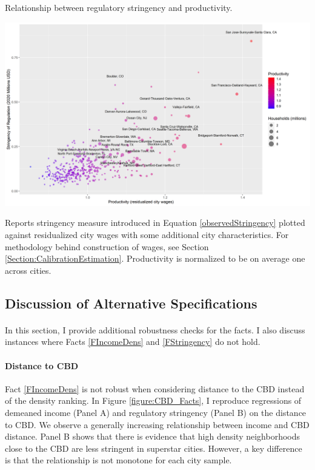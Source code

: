 \documentclass[12pt]{article}
\begin{document}
	\clearpage

	
	\begin{table}[htbp!]	
		\caption{Relationship between regulatory stringency and productivity.}\label{table:ProductivityStringency}
		\includegraphics[width=1.1\textwidth]{ProductivityStringency.png}
		\caption*{Reports stringency measure introduced in Equation \eqref{observedStringency} plotted against residualized city wages with some additional city characteristics. For methodology behind construction of wages, see Section \ref{Section:CalibrationEstimation}. Productivity is normalized to be on average one across cities.}
	\end{table}
	
	
	
	
	\clearpage
	
	\subsection{Discussion of Alternative Specifications}\label{Appendix:Robustness}
	\paragraph*{}
	In this section, I provide additional robustness checks for the facts. I also discuss instances where Facts \ref{FIncomeDens} and \ref{FStringency} do not hold. 
	
	\paragraph*{Distance to CBD} Fact \ref{FIncomeDens} is not robust when considering distance to the CBD instead of the density ranking. In Figure \ref{figure:CBD_Facts}, I reproduce regressions of demeaned income (Panel A) and regulatory stringency (Panel B) on the distance to CBD. We observe a generally increasing relationship between income and CBD distance. Panel B shows that there is evidence that high density neighborhoods close to the CBD are less stringent in superstar cities. However, a key difference is that the relationship is not monotone for each city sample. 
	
\end{document}

